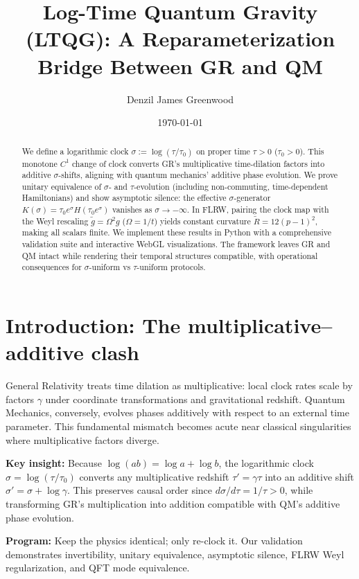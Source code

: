\documentclass[11pt]{article}
\title{Log-Time Quantum Gravity (LTQG): A Reparameterization Bridge Between GR and QM}
\author[1]{Denzil James Greenwood}
\affil[1]{Independent Research}
\date{\today}
\begin{document}
\maketitle

\begin{abstract}
We define a logarithmic clock $\sigma := \log(\tau/\tau_0)$ on proper time $\tau>0$ ($\tau_0>0$). This monotone $C^1$ change of clock converts GR's multiplicative time-dilation factors into additive $\sigma$-shifts, aligning with quantum mechanics' additive phase evolution. We prove unitary equivalence of $\sigma$- and $\tau$-evolution (including non-commuting, time-dependent Hamiltonians) and show asymptotic silence: the effective $\sigma$-generator $K(\sigma)=\tau_0 e^\sigma H(\tau_0 e^\sigma)$ vanishes as $\sigma\to-\infty$. In FLRW, pairing the clock map with the Weyl rescaling $\tilde{g}=\Omega^2 g$ ($\Omega=1/t$) yields constant curvature $\tilde{R}=12(p-1)^2$, making all scalars finite. We implement these results in Python with a comprehensive validation suite and interactive WebGL visualizations. The framework leaves GR and QM intact while rendering their temporal structures compatible, with operational consequences for $\sigma$-uniform vs $\tau$-uniform protocols.
\end{abstract}

\section{Introduction: The multiplicative–additive clash}

General Relativity treats time dilation as multiplicative: local clock rates scale by factors $\gamma$ under coordinate transformations and gravitational redshift. Quantum Mechanics, conversely, evolves phases additively with respect to an external time parameter. This fundamental mismatch becomes acute near classical singularities where multiplicative factors diverge.

\textbf{Key insight:} Because $\log(ab) = \log a + \log b$, the logarithmic clock $\sigma = \log(\tau/\tau_0)$ converts any multiplicative redshift $\tau' = \gamma\tau$ into an additive shift $\sigma' = \sigma + \log\gamma$. This preserves causal order since $d\sigma/d\tau = 1/\tau > 0$, while transforming GR's multiplication into addition compatible with QM's additive phase evolution.

\textbf{Program:} Keep the physics identical; only re-clock it. Our validation demonstrates invertibility, unitary equivalence, asymptotic silence, FLRW Weyl regularization, and QFT mode equivalence.
\end{document}
